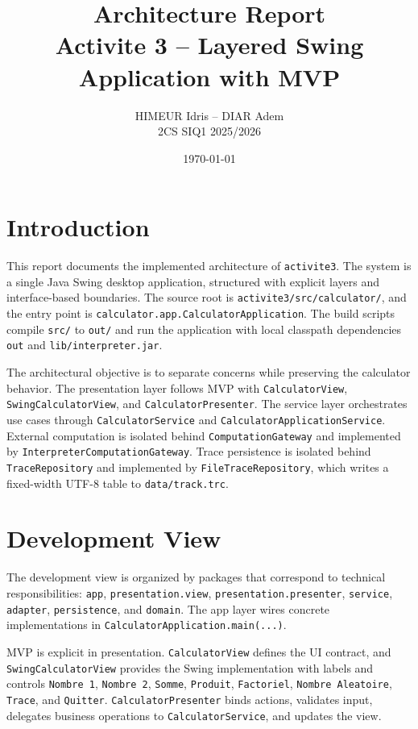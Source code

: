 \documentclass[11pt,a4paper]{article}
\title{Architecture Report\\Activite 3 -- Layered Swing Application with MVP}
\author{HIMEUR Idris -- DIAR Adem \\ 2CS SIQ1 2025/2026}
\date{\today}
\begin{document}
\maketitle
\tableofcontents
\newpage

\section{Introduction}

This report documents the implemented architecture of \texttt{activite3}. The system is a single Java Swing desktop application, structured with explicit layers and interface-based boundaries. The source root is \texttt{activite3/src/calculator/}, and the entry point is \texttt{calculator.app.CalculatorApplication}. The build scripts compile \texttt{src/} to \texttt{out/} and run the application with local classpath dependencies \texttt{out} and \texttt{lib/interpreter.jar}.

The architectural objective is to separate concerns while preserving the calculator behavior. The presentation layer follows MVP with \texttt{CalculatorView}, \texttt{SwingCalculatorView}, and \texttt{CalculatorPresenter}. The service layer orchestrates use cases through \texttt{CalculatorService} and \texttt{CalculatorApplicationService}. External computation is isolated behind \texttt{ComputationGateway} and implemented by \texttt{InterpreterComputationGateway}. Trace persistence is isolated behind \texttt{TraceRepository} and implemented by \texttt{FileTraceRepository}, which writes a fixed-width UTF-8 table to \texttt{data/track.trc}.

\section{Development View}

The development view is organized by packages that correspond to technical responsibilities: \texttt{app}, \texttt{presentation.view}, \texttt{presentation.presenter}, \texttt{service}, \texttt{adapter}, \texttt{persistence}, and \texttt{domain}. The app layer wires concrete implementations in \texttt{CalculatorApplication.main(...)}.

MVP is explicit in presentation. \texttt{CalculatorView} defines the UI contract, and \texttt{SwingCalculatorView} provides the Swing implementation with labels and controls \texttt{Nombre 1}, \texttt{Nombre 2}, \texttt{Somme}, \texttt{Produit}, \texttt{Factoriel}, \texttt{Nombre Aleatoire}, \texttt{Trace}, and \texttt{Quitter}. \texttt{CalculatorPresenter} binds actions, validates input, delegates business operations to \texttt{CalculatorService}, and updates the view.
\end{document}
